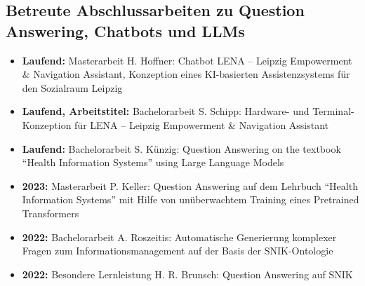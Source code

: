 \documentclass[a4paper,11pt]{article}
\begin{document}

\subsection*{Betreute Abschlussarbeiten zu Question Answering, Chatbots und LLMs}

\begin{itemize}
\item \textbf{Laufend:} Masterarbeit H. Hoffner: Chatbot LENA -- Leipzig Empowerment \& Navigation Assistant, Konzeption eines KI-basierten Assistenzsystems für den Sozialraum Leipzig
\item \textbf{Laufend, Arbeitstitel:} Bachelorarbeit S. Schipp: Hardware- und Terminal-Konzeption für LENA -- Leipzig Empowerment \& Navigation Assistant
\item \textbf{Laufend:} Bachelorarbeit S. Künzig: Question Answering on the textbook \enquote{Health Information Systems} using Large Language Models
\item \textbf{2023:} Masterarbeit P. Keller: Question Answering auf dem Lehrbuch \enquote{Health Information Systems} mit Hilfe von unüberwachtem Training eines Pretrained Transformers
\item \textbf{2022:} Bachelorarbeit A. Roszeitis: Automatische Generierung komplexer Fragen zum Informationsmanagement auf der Basis der SNIK-Ontologie
\item \textbf{2022:} Besondere Lernleistung H. R. Brunsch: Question Answering auf SNIK
\end{itemize}

\end{document}
